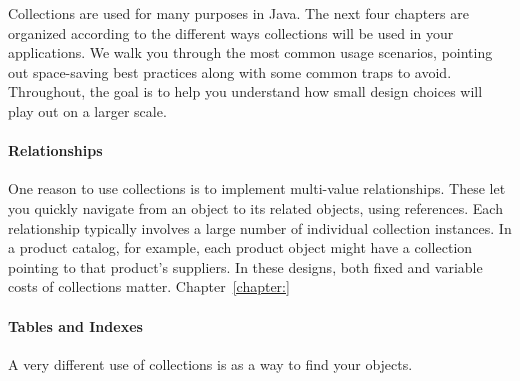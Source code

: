 Collections are used for many purposes in Java.  The next four chapters are
organized according to the different ways collections will be used in your
applications. We walk you through the most common usage scenarios, pointing out
space-saving best practices along with some common traps to avoid. 
Throughout, the goal is to help you understand how small design choices
will play out on a larger scale.


\paragraph{Relationships} One reason to use collections is to implement
multi-value relationships. These let you quickly navigate
from an object to its related objects, using references. Each relationship
typically involves a large number of individual collection instances.  In a
product catalog, for example, each product object might have a collection
pointing to that product's suppliers. In these designs, both fixed and variable costs of collections matter. Chapter~\ref{chapter:}

\paragraph{Tables and Indexes} A very different use of collections is as a way
to find your objects. 

